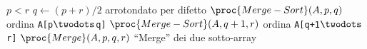 \begin{codebox}
\li \If $p < r$
\li     \Then
            $q \gets (p + r) / 2$ 
        \Comment arrotondato per difetto
\li         $\proc{Merge-Sort}(A,p,q)$
        \Comment ordina \texttt{A[p$\twodots$q]}
\li         $\proc{Merge-Sort}(A,q+1,r)$
        \Comment ordina \texttt{A[q+1$\twodots$r]}
\li         $\proc{Merge}(A,p,q,r)$
        \Comment ``Merge'' dei due sotto-array 
        \End
\end{codebox}
